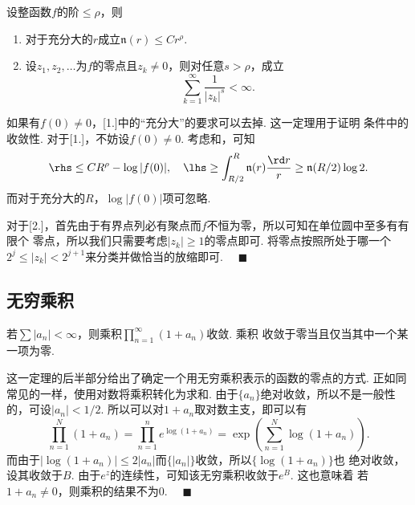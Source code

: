   \begin{thm}
    \label{thm: 整函数的阶}
    设整函数$f$的阶$\le\rho$，则
    \begin{enumerate}
      \item 对于充分大的$r$成立$\mathfrak{n}(r)\le Cr^\rho$.
      \item 设$z_1,z_2,\dots$为$f$的零点且$z_k\ne 0$，则对任意$s>\rho$，成立
        \[
          \sum_{k=1}^\infty\frac{1}{|z_k|^s} < \infty.
        \]
    \end{enumerate}
  \end{thm}
  \remark
    如果有$f(0)\ne 0$，[1.]中的“充分大”的要求可以去掉. 这一定理用于证明
    条件中的收敛性.
  \proof
    对于[1.]，不妨设$f(0)\ne 0$. 考虑和，可知
    \[\begin{split}
      \rhs \le CR^\rho-\log|f(0)|,\quad
      \lhs \ge \int_{R/2}^R\mathfrak{n}(r)\frac{\rd r}{r}\ge 
      \mathfrak{n}(R/2)\log 2.
    \end{split}\]
    而对于充分大的$R$，$\log|f(0)|$项可忽略.\par
    对于[2.]，首先由于有界点列必有聚点而$f$不恒为零，所以可知在单位圆中至多有有限个
    零点，所以我们只需要考虑$|z_k|\ge 1$的零点即可. 将零点按照所处于哪一个$2^j\le
    |z_k|<2^{j+1}$来分类并做恰当的放缩即可. $\quad\blacksquare$


\subsection{无穷乘积}
  \begin{thm}
    \label{thm: 无穷乘积}
    若$\sum|a_n|<\infty$，则乘积$\prod_{n=1}^\infty(1+a_n)$收敛. 乘积
    收敛于零当且仅当其中一个某一项为零.
  \end{thm}
  \remark
    这一定理的后半部分给出了确定一个用无穷乘积表示的函数的零点的方式.
  \proof
    正如同常见的一样，使用对数将乘积转化为求和. 由于$\{a_n\}$绝对收敛，所以不是一般性
    的，可设$|a_n|<1/2$. 所以可以对$1+a_n$取对数主支，即可以有
    \[
      \prod_{n=1}^N(1+a_n) = \prod_{n=1}^ne^{\log(1+a_n)}
      = \exp\left(\sum_{n=1}^N\log(1+a_n)\right).
    \]
    而由于$|\log(1+a_n)|\le 2|a_n|$而$\{|a_n|\}$收敛，所以$\{\log(1+a_n)\}$也
    绝对收敛，设其收敛于$B$. 由于$e^z$的连续性，可知该无穷乘积收敛于$e^B$. 这也意味着
    若$1+a_n\ne 0$，则乘积的结果不为$0$. $\quad\blacksquare$

